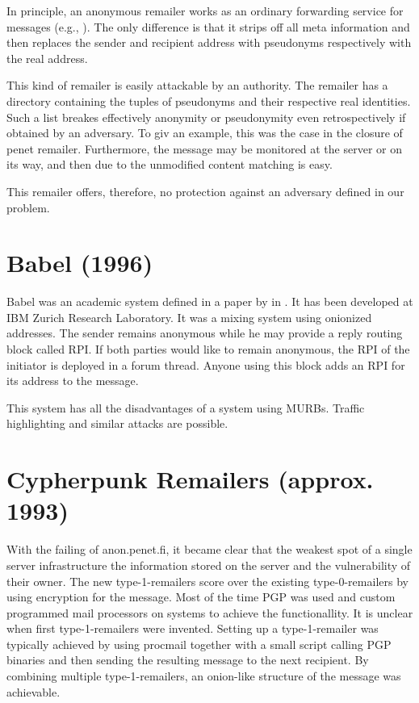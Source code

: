 In principle, an anonymous remailer works as an ordinary forwarding service for messages (e.g., ). The only difference is that it strips off all meta information and then replaces the sender and recipient address with pseudonyms respectively with the real address. 

This kind of remailer is easily attackable by an authority. The remailer has a directory containing the tuples of pseudonyms and their respective real identities. Such a list breakes effectively anonymity or pseudonymity even retrospectively if obtained by an adversary. To giv an example, this was the case in the closure of penet remailer\cite{penetClosure}. Furthermore, the message may be monitored at the server or on its way, and then due to the unmodified content matching is easy.

This remailer offers, therefore, no protection against an adversary defined in our problem.

\section{Babel (1996)}
Babel was an academic system defined in a paper by \citeauthor{babel} in \citeyear{babel}\cite{babel}. It has been developed at IBM Zurich Research Laboratory. It was a mixing system using onionized addresses. The sender remains anonymous while he may provide a reply routing block called RPI. If both parties would like to remain anonymous, the RPI of the initiator is deployed in a forum thread. Anyone using this block adds an RPI for its address to the message.

This system has all the disadvantages of a system using MURBs. Traffic highlighting and similar attacks are possible.

\section{Cypherpunk Remailers (approx. 1993)\label{sec:remCypherpunk}}
With the failing of anon.penet.fi, it became clear that the weakest spot of a single server infrastructure the information stored on the server and the vulnerability of their owner. The new type-1-remailers score over the existing type-0-remailers by using encryption for the message. Most of the time PGP was used and custom programmed mail processors on systems to achieve the functionallity. It is unclear when first type-1-remailers were invented. Setting up a type-1-remailer was typically achieved by using procmail together with a small script calling PGP binaries and then sending the resulting message to the next recipient. By combining multiple type-1-remailers, an onion-like structure of the message was achievable. 

